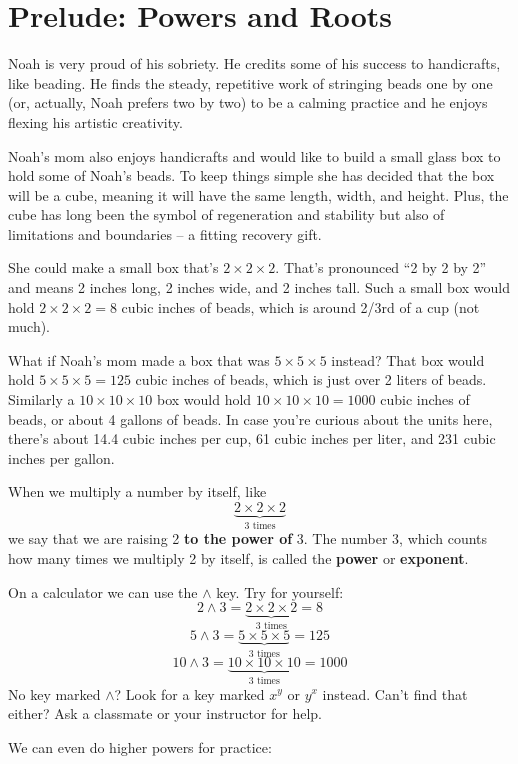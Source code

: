 \section{Prelude: Powers and Roots}

Noah is very proud of his sobriety.  He credits some of his success to handicrafts, like beading.  He finds the steady, repetitive work of stringing beads one by one (or, actually, Noah prefers two by two) to be a calming practice and he enjoys flexing his artistic creativity.  

Noah's mom also enjoys handicrafts and would like to build a small glass box to hold some of Noah's beads. To keep things simple she has decided that the box will be a cube, meaning it will have the same length, width, and height.  Plus, the cube has long been the symbol of regeneration and stability but also of limitations and boundaries -- a fitting recovery gift.

She could make a small box that's $2 \times 2 \times 2$.  That's pronounced ``2 by 2 by 2'' and means 2 inches long, 2 inches wide, and 2 inches tall.  Such a small box would hold $2 \times 2 \times 2 =  8$ cubic inches of beads, which is around 2/3rd of a cup (not much).

What if Noah's mom made a box that was $5 \times 5 \times 5$ instead?  That box would hold $5 \times 5 \times 5 = 125$ cubic inches of beads, which is just over 2 liters of beads. Similarly a $10 \times 10 \times 10$ box would hold $10 \times 10 \times 10 = 1000$ cubic inches of beads, or about 4 gallons of beads. In case you're curious about the units here, there's about 14.4 cubic inches per cup,  61 cubic inches per liter, and 231 cubic inches per gallon.  

When we multiply a number by itself, like $$\underbrace{2 \times 2 \times 2}_{3 \text{ times}}$$ we say that we are raising 2 \textbf{to the power of} 3.  The number 3, which counts how many times we multiply 2 by itself, is called the \textbf{power} or \textbf{exponent}. 

On a calculator we can use the $\land$ key.  Try for yourself:
$$2 \land 3 = \underbrace{2 \times 2 \times 2}_{3 \text{ times}} = 8$$
$$5 \land 3 = \underbrace{5 \times 5 \times 5}_{3 \text{ times}} = 125$$
$$10 \land 3 = \underbrace{10 \times 10 \times 10}_{3 \text{ times}} = 1000$$
No key marked $\land$? Look for a key marked $x^y$ or $y^x$ instead. Can't find that either?  Ask a classmate or your instructor for help.

We can even do higher powers for practice:

